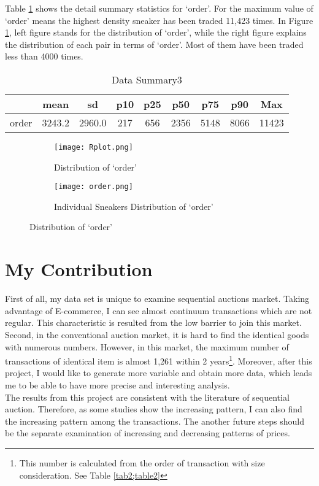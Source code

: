 \documentclass[a4paper]{article}
\theoremstyle{definition}
\theoremstyle{definition}
\theoremstyle{remark}
\begin{document}
\begin{large}
Table \ref{tab3;table3} shows the detail summary statistics for `order'. For the maximum value of `order' means the highest density sneaker has been traded 11,423 times.  In Figure \ref{fig2:fig2}, left figure stands for the distribution of `order', while the right figure explains the distribution of each pair in terms of `order'. Most of them have been traded less than 4000 times.

\begin{table}[H]
	\centering
	\caption{Data Summary3}
	\begin{tabular}{c|cccccccc}
		\hline\hline
		& mean & sd & p10 & p25 & p50 & p75 & p90 & Max \\\hline
		order & 3243.2 & 2960.0  & 217 & 656 & 2356 & 5148 & 8066 & 11423   \\
		\hline\hline
	\end{tabular}
	\label{tab3;table3}
\end{table}

\begin{figure}[h]
	\begin{subfigure}{0.5\textwidth}
		\centering
		\caption{Distribution of `order'}
		\texttt{[image: Rplot.png]}
	\end{subfigure}%
	\begin{subfigure}{0.5\textwidth}
		\centering
		\caption{Individual Sneakers Distribution of `order'}
		\texttt{[image: order.png]}
	\end{subfigure}
	\caption{Distribution of `order'}
	\label{fig2:fig2}
\end{figure}


\vspace{1cm}

\section{My Contribution}

First of all, my data set is unique to examine sequential auctions market. Taking advantage of E-commerce, I can see almost continuum transactions which are not regular. This characteristic is resulted from the low barrier to join this market. Second, in the conventional auction market, it is hard to find the identical goods with numerous numbers. However, in this market, the maximum number of transactions of identical item is almost 1,261 within 2 years\footnote{This number is calculated from the order of transaction with size consideration. See Table \ref{tab2;table2}}. Moreover, after this project, I would like to generate more variable and obtain more data, which leads me to be able to have more precise and interesting analysis. \\
The results from this project are consistent with the literature of sequential auction. Therefore, as some studies show the increasing pattern, I can also find the increasing pattern among the transactions. The another future steps should be the separate examination of increasing and decreasing patterns of prices.



\end{large}
\end{document}
